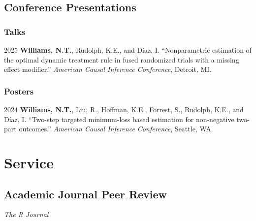 \documentclass[12pt,letterpaper]{report}
\newcommand{\listitemspace}{0.15em}
\renewenvironment{itemize}
{\begin{list}{}{\setlength{\leftmargin}{0em}
            \setlength{\parskip}{0em}
            \setlength{\itemsep}{\listitemspace}
            \setlength{\parsep}{\listitemspace}}}
    {\end{list}}
\begin{document}
    \subsection*{Conference Presentations}
    
    \subsubsection{Talks}
    
    \begin{tablist}
    
    \item[2025] \tab \textbf{Williams, N.T.}, Rudolph, K.E., and Díaz, I. \enquote{Nonparametric estimation of the optimal dynamic treatment rule in fused randomized trials with a missing effect modifier.} \textit{American Causal Inference Conference}, Detroit, MI.
    
    \end{tablist}
    
    \subsubsection{Posters}

    \begin{tablist}
    
    \item[2024] \tab \textbf{Williams, N.T.}, Liu, R., Hoffman, K.E., Forrest, S., Rudolph, K.E., and Díaz, I. \enquote{Two-step targeted minimum-loss based estimation for non-negative two-part outcomes.} \textit{American Causal Inference Conference}, Seattle, WA.

    \end{tablist}
    
    \section*{Service}
    
    \subsection*{Academic Journal Peer Review}
    
    \begin{itemize}
    
    	\item \textit{The R Journal}
    
    \end{itemize}
\end{document}
